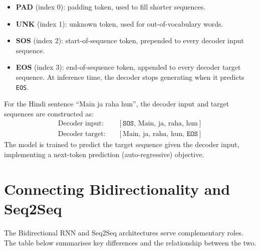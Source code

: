 \documentclass[12pt,a4paper]{article}
\begin{document}
\begin{itemize}
  \item \textbf{PAD} (index 0): padding token, used to fill shorter sequences.
  \item \textbf{UNK} (index 1): unknown token, used for out-of-vocabulary words.
  \item \textbf{SOS} (index 2): start-of-sequence token, prepended to every
        decoder input sequence.
  \item \textbf{EOS} (index 3): end-of-sequence token, appended to every
        decoder target sequence.  At inference time, the decoder stops
        generating when it predicts \texttt{EOS}.
\end{itemize}

\begin{example}[title=Decoder Sequence Construction]
  For the Hindi sentence ``Main ja raha hun'', the decoder input and target
  sequences are constructed as:
  \begin{align*}
    \text{Decoder input:}  &\quad [\texttt{SOS},\, \text{Main},\, \text{ja},\,
                                   \text{raha},\, \text{hun}] \\
    \text{Decoder target:} &\quad [\text{Main},\, \text{ja},\, \text{raha},\,
                                   \text{hun},\, \texttt{EOS}]
  \end{align*}
  The model is trained to predict the target sequence given the decoder input,
  implementing a next-token prediction (auto-regressive) objective.
\end{example}

\section{Connecting Bidirectionality and Seq2Seq}
\label{sec:connection}

The Bidirectional RNN and Seq2Seq architectures serve complementary roles.
The table below summarises key differences and the relationship between the two.
\end{document}
